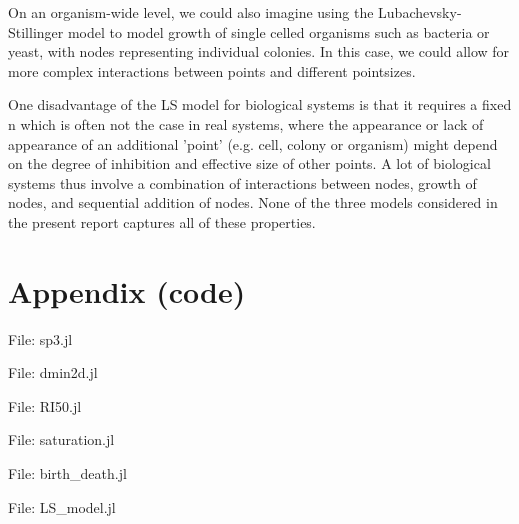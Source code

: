 \documentclass{article}
\begin{document}
On an organism-wide level, we could also imagine using the Lubachevsky-Stillinger model to model growth of single celled organisms such as bacteria or yeast, with nodes representing individual colonies. In this case, we could allow for more complex interactions between points and different pointsizes.

One disadvantage of the LS model for biological systems is that it requires a fixed n which is often not the case in real systems, where the appearance or lack of appearance of an additional 'point' (e.g. cell, colony or organism) might depend on the degree of inhibition and effective size of other points. A lot of biological systems thus involve a combination of interactions between nodes, growth of nodes, and sequential addition of nodes. None of the three models considered in the present report captures all of these properties.


\section{Appendix (code)}

\lstset{basicstyle=\footnotesize}

\large{File: sp3.jl}


\large{File: dmin2d.jl}


\large{File: RI50.jl}


\large{File: saturation.jl}


\large{File: birth\_death.jl}


\large{File: LS\_model.jl}

\end{document}
